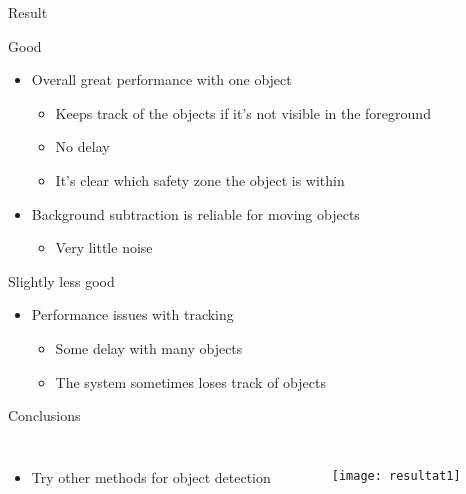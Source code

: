
\begin{frame}{Result}


Good
	\begin{itemize}
	\item Overall great performance with one object
		\begin{itemize}
		\item Keeps track of the objects if it's not visible in the foreground
		\item No delay
		\item It's clear which safety zone the object is within
		\end{itemize}
	\item Background subtraction is reliable for moving objects
		\begin{itemize}
		\item Very little noise
		\end{itemize}
	\end{itemize}
	
	\vspace{2mm}
Slightly less good
	\begin{itemize}
	\item Performance issues with tracking
		\begin{itemize}
			\item Some delay with many objects
			\item The system sometimes loses track of objects
		\end{itemize}
	\end{itemize}	
	
\end{frame}

\begin{frame}{Conclusions}

	 \begin{columns}[c] %
    
	\begin{itemize}
	\item Try other methods for object detection
	\end{itemize}
    \begin{figure}[H]
	\begin{center}
	\texttt{[image: resultat1]}
	\end{center}
	\end{figure}
    \end{columns}

\end{frame}
